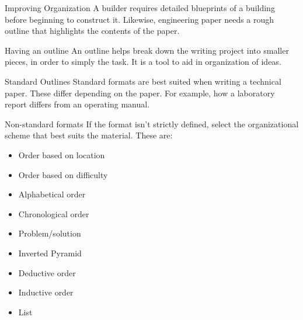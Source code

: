 \documentclass[10pt]{beamer}
\begin{document}
{
\begin{frame}{Improving Organization}
	A builder requires detailed blueprints of a building before beginning to construct it. Likewise, engineering paper needs a rough outline that highlights the contents of the paper. 

	\begin{alertblock}{Having an outline}
		An outline helps break down the writing project into smaller pieces, in order to simply the task. It is a tool to aid in organization of ideas. 
	\end{alertblock}
\end{frame}
}

{
\begin{frame}{Standard Outlines}
	Standard formats are best suited when writing a technical paper. These differ depending on the paper. For example, how a laboratory report differs from an operating manual. 

	\begin{alertblock}{Non-standard formats}
		If the format isn't strictly defined, select the organizational scheme that best suits the material. 
		These are:
		\begin{multicols}{2}
		\begin{itemize}
			\item Order based on location
			\item Order based on difficulty 
			\item Alphabetical order
			\item Chronological order
			\item Problem/solution
			\item Inverted Pyramid
			\item Deductive order
			\item Inductive order
			\item List
		\end{itemize}
		\end{multicols}
	\end{alertblock}
\end{frame}
}
\end{document}
